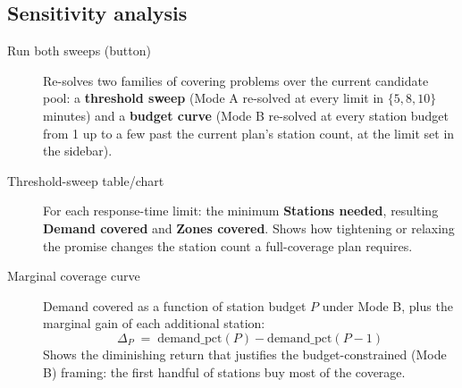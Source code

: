 \documentclass[11pt]{article}
\begin{document}
\subsection{Sensitivity analysis}
\begin{description}
  \item[Run both sweeps (button)] Re-solves two families of covering problems
    over the current candidate pool: a \textbf{threshold sweep} (Mode A
    re-solved at every limit in $\{5, 8, 10\}$ minutes) and a \textbf{budget
    curve} (Mode B re-solved at every station budget from 1 up to a few past
    the current plan's station count, at the limit set in the sidebar).
  \item[Threshold-sweep table/chart] For each response-time limit: the
    minimum \textbf{Stations needed}, resulting \textbf{Demand covered} and
    \textbf{Zones covered}. Shows how tightening or relaxing the promise
    changes the station count a full-coverage plan requires.
  \item[Marginal coverage curve] Demand covered as a function of station
    budget $P$ under Mode B, plus the marginal gain of each additional
    station:
    \[
      \Delta_P \;=\; \text{demand\_pct}(P) - \text{demand\_pct}(P-1)
    \]
    Shows the diminishing return that justifies the budget-constrained (Mode
    B) framing: the first handful of stations buy most of the coverage.
\end{description}
\end{document}
